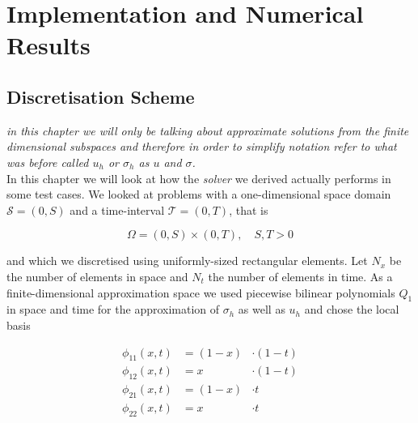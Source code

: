 \documentclass[../draft_1.tex]{subfiles}
\begin{document}
\chapter{Implementation and Numerical Results}

\section{Discretisation Scheme}
\textit{ in this chapter we will only be talking about approximate solutions from the finite dimensional subspaces and therefore in order to simplify notation refer to what was before called $u_h$ or $\sigma_h$ as $u$ and $\sigma$.}\\
In this chapter we will look at how the \textit{solver} we derived actually performs in some test cases. We looked at problems with a one-dimensional space domain $\mathcal{S} = (0, S)$ and a time-interval $\mathcal{T} = (0,T)$, that is 
\begin{ceqn}
\begin{equation}
\Omega = (0, S) \times (0, T), \quad S,T > 0
\end{equation}
\end{ceqn}
and which we discretised using uniformly-sized rectangular elements. Let $N_x$ be the number of elements in space and $N_t$ the number of elements in time. As a finite-dimensional approximation space we used piecewise bilinear polynomials $Q_1$ in space and time for the approximation of $\sigma_h$ as well as $u_h$ and chose the local basis \\

\begin{minipage}[l]{0.5\linewidth}
	
\end{minipage}%
\begin{minipage}[r]{0.5\linewidth}
\begin{ceqn}
	\begin{equation}
	\begin{aligned}
	\phi_{11}(x,t) &= (1- x) &\cdot (1-t) \\
	\phi_{12}(x,t) &=  x  &\cdot  (1-t) \\
	\phi_{21}(x,t) &= (1- x) &\cdot t  \\
	\phi_{22}(x,t) &= x  &\cdot  t 
	\end{aligned}
	\end{equation}
	\end{ceqn}
\end{minipage}
\end{document}
